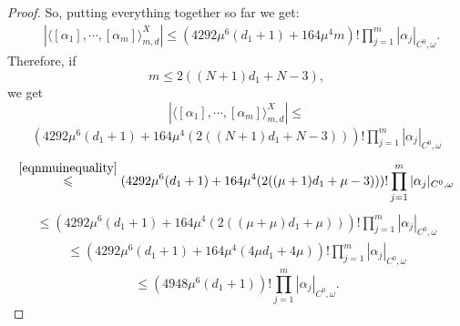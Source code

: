 \documentclass[10pt,a4paper]{amsart}
\renewcommand{\leq}{\leqslant}
\begin{document}
\begin{proof}
	So, putting everything together so far we get:
	\begin{equation} \label{eqn3tr943t049}
		\begin{aligned}
			 & \left| \langle [\alpha_1],\cdots,[\alpha_m] \rangle_{m,d}^X \right| \leq
			(4292\mu^6(d_1+1)+ 164\mu^4m)!
			\prod_{j=1}^m |\alpha_j|_{C^0,\omega}.
		\end{aligned}
	\end{equation}
	Therefore, if
	\begin{equation}
		m \leq 2((N+1)d_1+ N-3),
	\end{equation}
	we get
	\begin{equation} \label{eqn3tr943t0493}
		\left| \langle [\alpha_1],\cdots,[\alpha_m] \rangle_{m,d}^X \right|
		\leq
	\end{equation}
	\begin{equation}
		\begin{aligned}
			(4292\mu^6(d_1+1)+ 164\mu^4(2((N+1)d_1+ N-3)))!
			\prod_{j=1}^m |\alpha_j|_{C^0,\omega}
		\end{aligned}
	\end{equation}
	\begin{equation}
		\begin{aligned}
			\overset{\textnormal{\eqref{eqnmuinequality}}}{\leq}
			(4292\mu^6(d_1+1)+ 164\mu^4(2((\mu+1)d_1+ \mu-3)))!
			\prod_{j=1}^m |\alpha_j|_{C^0,\omega}
		\end{aligned}
	\end{equation}
	\begin{equation}
		\begin{aligned}
			\leq
			(4292\mu^6(d_1+1)+ 164\mu^4(2((\mu+\mu)d_1+ \mu)))!
			\prod_{j=1}^m |\alpha_j|_{C^0,\omega}
		\end{aligned}
	\end{equation}
	\begin{equation}
		\begin{aligned}
			\leq
			(4292\mu^6(d_1+1)+ 164\mu^4(4\mu d_1+ 4\mu))!
			\prod_{j=1}^m |\alpha_j|_{C^0,\omega}
		\end{aligned}
	\end{equation}
	\begin{equation}
		\leq
		(4948\mu^6(d_1+1))!
		\prod_{j=1}^m |\alpha_j|_{C^0,\omega}.
	\end{equation}


\end{proof}
\end{document}
